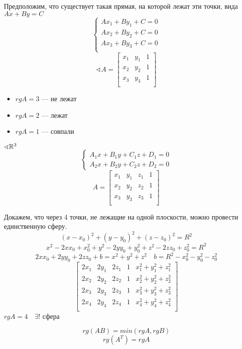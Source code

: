     Предположим, что существует такая прямая, на которой лежат эти точки, вида $Ax + By = C$
    $$\begin{cases}
        Ax_1 + By_1 + C = 0 \\
        Ax_2 + By_2 + C = 0 \\
        Ax_3 + By_3 + C = 0 \\
    \end{cases}$$
    $$\sphericalangle A = \begin{bmatrix}
        x_1 & y_1 & 1 \\
        x_2 & y_2 & 1 \\
        x_3 & y_3 & 1 \\
    \end{bmatrix}$$
    \begin{itemize}
        \item $rg A = 3$ --- не лежат
        \item $rg A = 2$ --- лежат
        \item $rg A = 1$ --- совпали
    \end{itemize}

    $\sphericalangle \mathbb{R}^3$
    $$\begin{cases}
        A_1x+B_1y+C_1z+D_1=0 \\
        A_2x+B_2y+C_2z+D_2=0
    \end{cases}$$
    $$A=\begin{bmatrix}
        x_1 & y_1 & z_1 & 1 \\
        x_2 & y_2 & z_2 & 1 \\
        x_3 & y_3 & z_3 & 1 \\
    \end{bmatrix}$$

    Докажем, что через 4 точки, не лежащие на одной плоскости, можно провести единственную сферу.
    $$(x-x_0)^2+(y-y_0)^2+(z-z_0)^2=R^2$$
    $$x^2-2xx_0+x_0^2 + y^2-2yy_0+y_0^2 + z^2-2zz_0+z_0^2 = R^2$$
    $$2xx_0 + 2yy_0 + 2zz_0 + b = x^2 + y^2 + z^2 \quad b = R^2-x_0^2-y_0^2-z_0^2$$
    $$\begin{bmatrix}
        2x_1 & 2y_1 & 2z_1 & 1 & x_1^2+y_1^2+z_1^2 \\
        2x_2 & 2y_2 & 2z_2 & 1 & x_2^2+y_2^2+z_2^2 \\
        2x_3 & 2y_3 & 2z_3 & 1 & x_3^2+y_3^2+z_3^2 \\
        2x_4 & 2y_4 & 2z_4 & 1 & x_4^2+y_4^2+z_4^2 \\
    \end{bmatrix}$$
    $rg A = 4 \quad \exists!$ сфера

    $$rg(AB) = min (rg A, rg B)$$
    $$rg(A^T)=rg A$$
    

